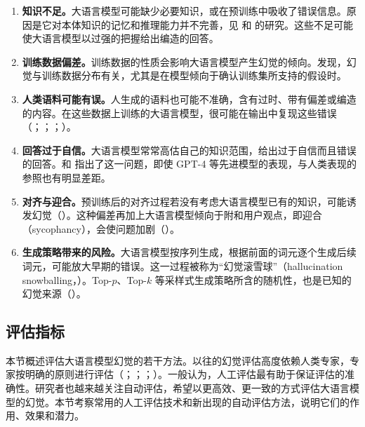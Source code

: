 \begin{enumerate}
\item \textbf{知识不足。}大语言模型可能缺少必要知识，或在预训练中吸收了错误信息。原因是它对本体知识的记忆和推理能力并不完善，见 和 的研究。这些不足可能使大语言模型以过强的把握给出编造的回答。
\item \textbf{训练数据偏差。}训练数据的性质会影响大语言模型产生幻觉的倾向。发现，幻觉与训练数据分布有关，尤其是在模型倾向于确认训练集所支持的假设时。
\item \textbf{人类语料可能有误。}人生成的语料也可能不准确，含有过时、带有偏差或编造的内容。在这些数据上训练的大语言模型，很可能在输出中复现这些错误（；；；）。
\item \textbf{回答过于自信。}大语言模型常常高估自己的知识范围，给出过于自信而且错误的回答。和 指出了这一问题，即使 GPT-4 等先进模型的表现，与人类表现的参照也有明显差距。
\item \textbf{对齐与迎合。}预训练后的对齐过程若没有考虑大语言模型已有的知识，可能诱发幻觉（）。这种偏差再加上大语言模型倾向于附和用户观点，即迎合（sycophancy），会使问题加剧（）。
\item \textbf{生成策略带来的风险。}大语言模型按序列生成，根据前面的词元逐个生成后续词元，可能放大早期的错误。这一过程被称为“幻觉滚雪球”（hallucination snowballing，）。Top-$p$、Top-$k$ 等采样式生成策略所含的随机性，也是已知的幻觉来源（）。
\end{enumerate}

\subsection{评估指标}
本节概述评估大语言模型幻觉的若干方法。以往的幻觉评估高度依赖人类专家，专家按明确的原则进行评估（；；；）。一般认为，人工评估最有助于保证评估的准确性。研究者也越来越关注自动评估，希望以更高效、更一致的方式评估大语言模型的幻觉。本节考察常用的人工评估技术和新出现的自动评估方法，说明它们的作用、效果和潜力。

